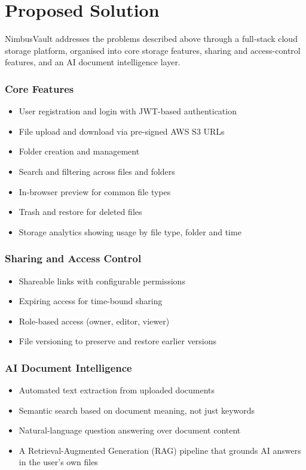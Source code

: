 \documentclass{tietreport}
\begin{document}
\chapter{Proposed Solution}

NimbusVault addresses the problems described above through a full-stack cloud storage platform, organised into core storage features, sharing and access-control features, and an AI document intelligence layer.

\subsection{Core Features}
\begin{itemize}[leftmargin=1.2cm, itemsep=3pt]
    \item User registration and login with JWT-based authentication
    \item File upload and download via pre-signed AWS S3 URLs
    \item Folder creation and management
    \item Search and filtering across files and folders
    \item In-browser preview for common file types
    \item Trash and restore for deleted files
    \item Storage analytics showing usage by file type, folder and time
\end{itemize}

\subsection{Sharing and Access Control}
\begin{itemize}[leftmargin=1.2cm, itemsep=3pt]
    \item Shareable links with configurable permissions
    \item Expiring access for time-bound sharing
    \item Role-based access (owner, editor, viewer)
    \item File versioning to preserve and restore earlier versions
\end{itemize}

\subsection{AI Document Intelligence}
\begin{itemize}[leftmargin=1.2cm, itemsep=3pt]
    \item Automated text extraction from uploaded documents
    \item Semantic search based on document meaning, not just keywords
    \item Natural-language question answering over document content
    \item A Retrieval-Augmented Generation (RAG) pipeline that grounds AI answers in the user's own files
\end{itemize}
\end{document}

